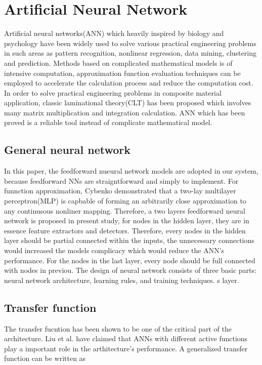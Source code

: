 \section{Artificial Neural Network}
Artificial neural networks(ANN) which heavily inspired by biology and psychology
have been widely used to solve various practical engineering problems in such
areas as pattern recognition, nonlinear regression, data mining, clustering and
prediction. Methods based on complicated mathematical models is of intensive
computation, approximation function evaluation techniques can be employed to
accelerate the calculation process and reduce the computation cost. In order to
solve practical engineering problems in composite material application, classic
laminational theory(CLT) has been proposed which involves many matrix
multiplication and integration calculation. ANN which has been proved is a
reliable tool instead of complicate mathematical model.  

\subsection{General neural network}

In this paper, the feedforward nueural network models are adopted in our
system, because feedforward NNs are straigntforward and simply to implement.  For
funnction approximation, Cybenko demonstrated that a two-lay multilayer
perceptron(MLP) is capbable of forming an arbitrarily close approximation to
any continusous nonliner mapping\cite{cybenko1989approximation}. Therefore, a
two layers feedforward neural network is proposed in present study, for nodes
in the hidden layer, they are in essence feature extractors and detectors.
Therefore, every nodes in the hidden layer should be partial connected within
the inputs, the unnecessary connections would increased the models complicacy
which would reduce the ANN's performance. For the nodes in the last layer,
every node should be full connected with nodes in previou. The design of neural
network consists of three basic parts: neural network architecture, learning
rules, and training techniques.
s layer.


\subsection{Transfer function}
The transfer fucntion has been shown to be one of the critical part of the
architecture. Liu \cite{liu1996evolutionary} et al. have claimed that ANNs with
different active functions play a important role in the arthitecture's performance.
A generalized transfer function can be written as


